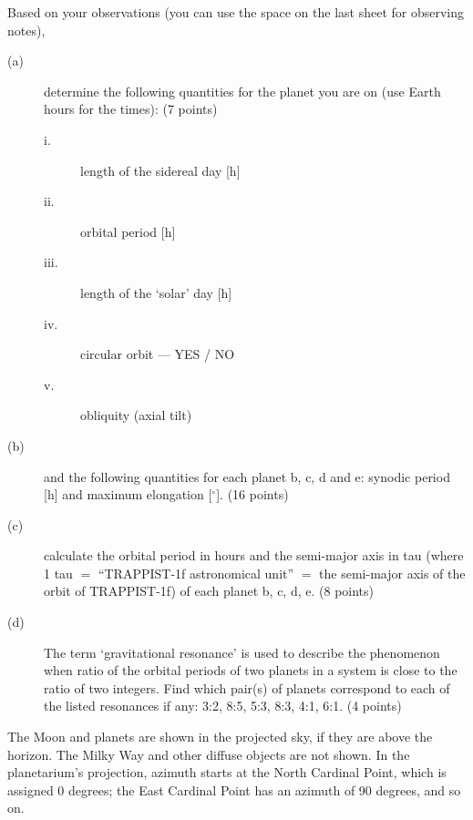 Based on your observations (you can use the space on the last sheet for
observing notes),
\begin{description}
\item[(a)] determine the following quantities for the planet you are on (use
  Earth hours for the times): \hfill(7 points)
  \begin{description}
  \item[i.] length of the sidereal day [h]
  \item[ii.] orbital period [h]
  \item[iii.] length of the `solar' day [h]
  \item[iv.] circular orbit --- YES / NO
  \item[v.] obliquity (axial tilt)
  \end{description}
\item[(b)] and the following quantities for each planet b, c, d and e:
  synodic period [h] and maximum elongation [$^\circ$]. \hfill(16 points)
\item[(c)] calculate the orbital period in hours and the semi-major axis in
  tau (where 1 tau $=$ ``TRAPPIST-1f astronomical unit'' $=$ the semi-major
  axis of the orbit of TRAPPIST-1f) of each planet b, c, d, e.
  \hfill(8 points)
\item[(d)] The term `gravitational resonance' is used to describe the
  phenomenon when ratio %
  of the orbital periods of two planets in a system
  is close to the ratio of two integers. Find which pair(s) of planets
  correspond to each of the listed resonances if any: 3:2, 8:5, 5:3, 8:3,
  4:1, 6:1. \hfill(4 points)
\end{description}

The Moon and planets are shown in the projected sky, if they are above the
horizon. The Milky Way and other diffuse objects are not shown. In the
planetarium's projection, azimuth starts at the North Cardinal Point, which
is assigned 0 degrees; the East Cardinal Point has an azimuth of 90 degrees,
and so on.

